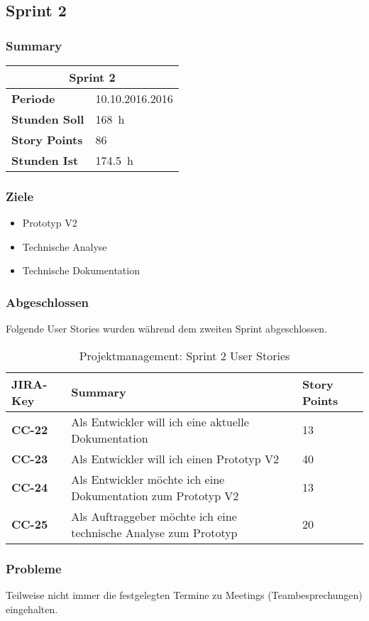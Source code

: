 \subsection{Sprint 2}

\subsubsection*{Summary}

\begin{table}[H]
	\centering
	\begin{tabular}{ll}
		\toprule
		\multicolumn{2}{c}{\textbf{Sprint 2}}\\
		\midrule
		\textbf{Periode} & 10.10.2016\textendash 30.10.2016\\
		\textbf{Stunden Soll} & \SI{168}{\hour}\\
		\textbf{Story Points} & 86\\
		\textbf{Stunden Ist} & \SI{174,5}{\hour}\\
		\bottomrule
	\end{tabular}
\end{table}

\subsubsection*{Ziele}
\begin{itemize}
  \item Prototyp V2
  \item Technische Analyse
  \item Technische Dokumentation
\end{itemize}


\subsubsection*{Abgeschlossen}
Folgende User Stories wurden während dem zweiten Sprint abgeschlossen.
\begin{table}[H]
    \centering
	\begin{tabularx}{\textwidth}{l X l}
	\toprule
	\textbf{JIRA-Key} & \textbf{Summary} & \textbf{Story Points}\\
	\midrule
        \textbf{CC-22} & Als Entwickler will ich eine aktuelle Dokumentation & 13 \\
         \textbf{CC-23} & Als Entwickler will ich einen Prototyp V2 & 40\\
          \textbf{CC-24} & Als Entwickler möchte ich eine Dokumentation zum Prototyp V2 & 13 \\
          \textbf{CC-25} & Als Auftraggeber möchte ich eine technische Analyse zum Prototyp & 20\\
	\bottomrule
    \end{tabularx}
    \caption{Projektmanagement: Sprint 2 User Stories}
\end{table}

\subsubsection*{Probleme}
Teilweise nicht immer die festgelegten Termine zu Meetings (Teambesprechungen) eingehalten.
